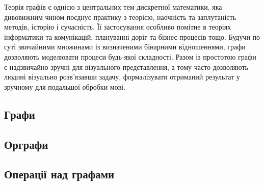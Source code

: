 Теорія графів є однією з центральних тем дискретної математики, яка дивовижним чином поєднує практику з теорією, наочність та заплутаність методів, історію і сучасність. Її застосування особливо помітне в теоріях інформатики та комунікацій, плануванні доріг та бізнес процесів тощо. Будучи по суті звичайними множинами із визначеними бінарними відношеннями, графи дозволяють моделювати процеси будь-якої складності. Разом із простотою графи є надзвичайно зручні для візуального представлення, а тому часто дозволяють людині візуально розв'язавши задачу, формалізувати отриманий результат у зручному для подальшої обробки мові.
\newpage
\subsection{Графи}


\newpage
\subsection{Орграфи}


\newpage
\subsection{Операції над графами}

